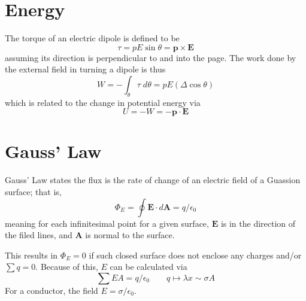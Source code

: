 \documentclass[oneside,12pt]{book}
\renewcommand{\b}{\mathbf}
\begin{document}
\section{Energy}
The torque of an electric dipole is defined to be
\begin{equation}
    \tau = pE \sin \theta = \b p \times \b E
\end{equation}
assuming its direction is perpendicular to and into the page. The work done by the external field in turning a dipole is thus
\begin{equation}
    W = - \int_\theta \tau \; d \theta = pE(\Delta \cos \theta)
\end{equation}
which is related to the change in potential energy via
\begin{equation}
    U = - W = - \b p \cdot \b E
\end{equation}

\section{Gauss' Law}
Gauss' Law states the flux is the rate of change of an electric field of a Guassion surface; that is,
\begin{equation}
    \Phi_E = \oint \b E \cdot d \b A = q / \epsilon_0
\end{equation}
meaning for each infinitesimal point for a given surface, $\b E$ is in the direction of the filed lines, and $\b A$ is normal to the surface.

\bigskip
This results in $\Phi_E = 0$ if such closed surface does not enclose any charges and/or $\sum q = 0$. Because of this, $E$ can be calculated via \begin{equation}
    \sum EA = q / \epsilon_0 \qquad q \mapsto \lambda x \sim \sigma A
\end{equation}
For a conductor, the field $E = \sigma / \epsilon_0$.
\end{document}
